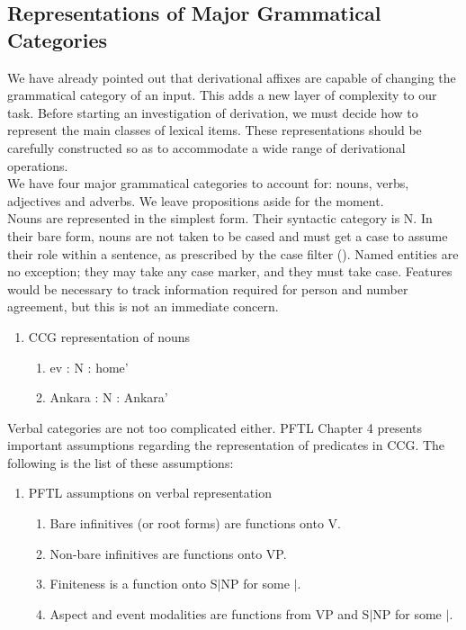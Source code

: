 \documentclass[11pt]{article} %
\begin{document}
\subsection{Representations of Major Grammatical Categories}

\label{ReprMajGrCate}

We have already pointed out that derivational affixes are capable of changing the grammatical category of an input. This adds a new layer of complexity to our task. Before starting an investigation of derivation, we must decide how to represent the main classes of lexical items. These representations should be carefully constructed so as to accommodate a wide range of derivational operations.\\

We have four major grammatical categories to account for: nouns, verbs, adjectives and adverbs. We leave propositions aside for the moment. \\

Nouns are represented in the simplest form. Their syntactic category is N. In their bare form, nouns are not taken to be cased and must get a case to assume their role within a sentence, as prescribed by the case filter (\citet{Cowper1992}). Named entities are no exception; they may take any case marker, and they must take case. Features would be necessary to track information required for person and number agreement, but this is not an immediate concern. 

\begin{enumerate}[resume*]
	\item CCG representation of nouns
	\begin{enumerate}[label=(\alph*), ref=(\alph*)]\itemsep1pt
	\item ev : N : home'
	\item Ankara : N : Ankara'
	\end{enumerate}
\end{enumerate}

Verbal categories are not too complicated either. PFTL Chapter 4 presents important assumptions regarding the representation of predicates in CCG. The following is the list of these assumptions:

\begin{enumerate}[resume*]
	\item PFTL assumptions on verbal representation
	\begin{enumerate}[label=(\alph*), ref=(\alph*)]\itemsep1pt
	\item Bare infinitives (or root forms) are functions onto V.
	\item Non-bare infinitives are functions onto VP.
	\item Finiteness is a function onto S$|$NP for some $|$.
	\item Aspect and event modalities are functions from VP and S$|$NP for some $|$.
	\end{enumerate}
\end{enumerate}
\end{document}
